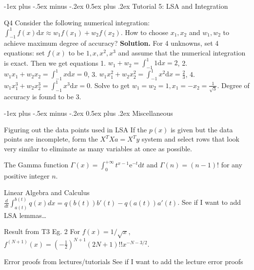 \documentclass[10pt,landscape]{article}
\makeatletter
\renewcommand{\section}{\@startsection{section}{1}{0mm}%
                                {-1ex plus -.5ex minus -.2ex}%
                                {0.5ex plus .2ex}%
                                {\normalfont\large\bfseries}}
\theoremstyle{definition}
\newcommand{\thistheoremname}{}
\newtheorem*{genericthm*}{\thistheoremname}
\newenvironment{namedthm*}[1]
{\renewcommand{\thistheoremname}{#1}\begin{genericthm*}}
{\end{genericthm*}}
\makeatother
\begin{document}
\begin{multicols}{3}
	\section{Tutorial 5: LSA and Integration}
	\begin{namedthm*}{Q4}
		Consider the following numerical integration: \(\int_{-1}^{1} f(x) \mathrm{d} x \approx w_{1} f\left(x_{1}\right)+w_{2} f\left(x_{2}\right)\).
		How to choose \(x_{1}, x_{2}\) and \(w_{1}, w_{2}\) to achieve maximum degree of accuracy? \textbf{Solution.} For 4 unknowns, set 4 equations: set \(f(x)\) to be \(1, x, x^{2}, x^{3}\) and assume that the numerical integration is exact. Then we get
		equations 1.
		\(
		w_{1}+w_{2}=\int_{-1}^{1} 1 \mathrm{d} x=2
		\), 2.
		\(w_{1} x_{1}+w_{2} x_{2}=\int_{-1}^{1} x \mathrm{d} x=0\), 3.
		\(w_{1} x_{1}^{2}+w_{2} x_{2}^{2}=\int_{-1}^{1} x^{2} \mathrm{d} x=\frac{2}{3}\), 4.
		\(w_{1} x_{1}^{3}+w_{2} x_{2}^{3}=\int_{-1}^{1} x^{3} \mathrm{d} x=0\). Solve to get \(w_1 = w_2 = 1, x_1 = -x_2 = \frac{1}{\sqrt{3}}\). Degree of accuracy is found to be 3.

	\end{namedthm*}

	\section{Miscellaneous}
	\begin{namedthm*}{Figuring out the data points used in LSA} If the \(p(x)\) is given but the data points are incomplete, form the \(X^TXa=X^Ty\) system and select rows that look very similar to eliminate as many variables at once as possible.
	\end{namedthm*}
	\begin{namedthm*}{The Gamma function} \(\Gamma(x)=\int_{0}^{+\infty} t^{x-1} \mathrm{e}^{-t} \mathrm{d} t\) and \(\Gamma(n)=(n-1) !\) for any positive integer \(n\).
	\end{namedthm*}
	\begin{namedthm*}{Linear Algebra and Calculus}
		\(\frac{d}{dt}\int_{a(t)}^{b(t)}q(x)dx= q(b(t))b'(t)-q(a(t))a'(t)\).
		\color{red}
		See if I want to add LSA lemmas\dots
		\color{black}
	\end{namedthm*}
	\begin{namedthm*}{Result from T3 Eg. 2}
		For \(f(x)=1 / \sqrt{x}\),
		\(
		f^{(N+1)}(x)=\left(-\frac{1}{2}\right)^{N+1}(2 N+1) !! x^{-N-3 / 2}
		\).
	\end{namedthm*}
	\begin{namedthm*}{Error proofs from lectures/tutorials}
		\color{red} See if I want to add the lecture error proofs
		\color{black}


\end{namedthm*}
\end{multicols}
\end{document}
